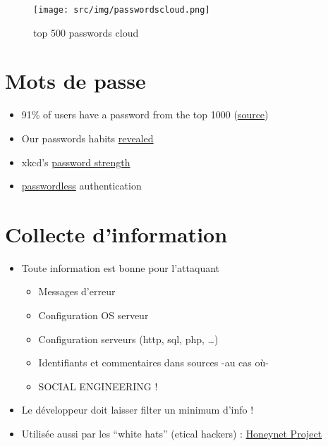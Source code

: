 \begin{figure}
\centering
\texttt{[image: src/img/passwordscloud.png]}
\caption{top 500 passwords cloud}
\end{figure}

\hypertarget{mots-de-passe}{%
\section{Mots de passe}\label{mots-de-passe}}

\begin{itemize}
\tightlist
\item
  91\% of users have a password from the top 1000
  (\href{https://xato.net/10-000-top-passwords-6d6380716fe0\#.q5gcg2vme}{source})
\item
  Our passwords habits
  \href{http://visual.ly/our-password-habits-revealed}{revealed}
\item
  xkcd's \href{http://xkcd.com/936/}{password strength}
\item
  \href{https://hacks.mozilla.org/2014/10/passwordless-authentication-secure-simple-and-fast-to-deploy/}{passwordless}
  authentication
\end{itemize}

\hypertarget{collecte-dinformation}{%
\section{Collecte d'information}\label{collecte-dinformation}}

\begin{itemize}
\tightlist
\item
  Toute information est bonne pour l'attaquant

  \begin{itemize}
  \tightlist
  \item
    Messages d'erreur
  \item
    Configuration OS serveur
  \item
    Configuration serveurs (http, sql, php, \ldots{})
  \item
    Identifiants et commentaires dans sources -au cas où-
  \item
    SOCIAL ENGINEERING !
  \end{itemize}
\item
  Le développeur doit laisser filter un minimum d'info !
\item
  Utilisée aussi par les ``white hats'' (etical hackers) :
  \href{https://www.honeynet.org/node/960}{Honeynet Project}
\end{itemize}


